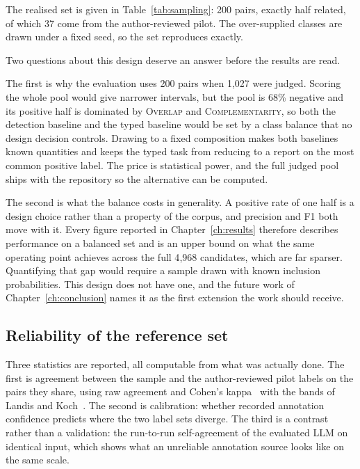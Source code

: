 The realised set is given in Table~\ref{tab:sampling}: 200 pairs, exactly half
related, of which 37 come from the author-reviewed pilot. The over-supplied
classes are drawn under a fixed seed, so the set reproduces exactly.

Two questions about this design deserve an answer before the results are read.

The first is why the evaluation uses 200 pairs when 1{,}027 were judged. Scoring
the whole pool would give narrower intervals, but the pool is 68\% negative and
its positive half is dominated by \textsc{Overlap} and \textsc{Complementarity},
so both the detection baseline and the typed baseline would be set by a class
balance that no design decision controls. Drawing to a fixed composition makes
both baselines known quantities and keeps the typed task from reducing to a
report on the most common positive label. The price is statistical power, and the
full judged pool ships with the repository so the alternative can be computed.

The second is what the balance costs in generality. A positive rate of one half
is a design choice rather than a property of the corpus, and precision and F1
both move with it. Every figure reported in Chapter~\ref{ch:results} therefore
describes performance on a balanced set and is an upper bound on what the same
operating point achieves across the full 4{,}968 candidates, which are far
sparser. Quantifying that gap would require a sample drawn with known inclusion
probabilities. This design does not have one, and the future work of
Chapter~\ref{ch:conclusion} names it as the first extension the work should
receive.

\subsection{Reliability of the reference set}\label{sec:gtvalidation}

Three statistics are reported, all computable from what was actually done. The
first is agreement between the sample and the author-reviewed pilot labels on the
pairs they share, using raw agreement and Cohen's kappa~\cite{cohen1960kappa}
with the bands of Landis and Koch~\cite{landis1977kappa}. The second is
calibration: whether recorded annotation confidence predicts where the two label
sets diverge. The third is a contrast rather than a validation: the run-to-run
self-agreement of the evaluated LLM on identical input, which shows what an
unreliable annotation source looks like on the same scale.

